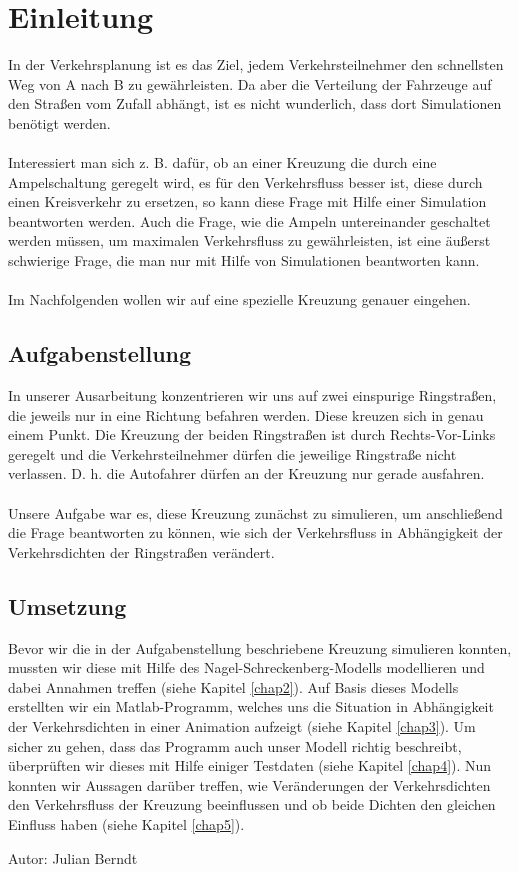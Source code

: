 \chapter{Einleitung}

In der Verkehrsplanung ist es das Ziel, jedem Verkehrsteilnehmer den schnellsten Weg von A nach B zu gewährleisten. Da aber die Verteilung der Fahrzeuge auf den Straßen vom Zufall abhängt, ist es nicht wunderlich, dass dort Simulationen benötigt werden. \\ \\
Interessiert man sich z. B. dafür, ob an einer Kreuzung die durch eine Ampelschaltung geregelt wird, es für den Verkehrsfluss besser ist, diese durch einen Kreisverkehr zu ersetzen, so kann diese Frage mit Hilfe einer Simulation beantworten werden. Auch die Frage, wie die Ampeln untereinander geschaltet werden müssen, um maximalen Verkehrsfluss zu gewährleisten, ist eine äußerst schwierige Frage, die man nur mit Hilfe von Simulationen beantworten kann. \\ \\
Im Nachfolgenden wollen wir auf eine spezielle Kreuzung genauer eingehen.

\section{Aufgabenstellung}\label{sec:aufgabenstellung}
In unserer Ausarbeitung konzentrieren wir uns auf zwei einspurige Ringstraßen, die jeweils nur in eine Richtung befahren werden. Diese kreuzen sich in genau einem Punkt. Die Kreuzung der beiden Ringstraßen ist durch Rechts-Vor-Links geregelt und die Verkehrsteilnehmer dürfen die jeweilige Ringstraße nicht verlassen. D. h. die Autofahrer dürfen an der Kreuzung nur gerade ausfahren. 
\\ \\
Unsere Aufgabe war es, diese Kreuzung zunächst zu simulieren, um anschließend die Frage beantworten zu können, wie sich der Verkehrsfluss in Abhängigkeit der Verkehrsdichten %
der Ringstraßen verändert.
\section{Umsetzung}
Bevor wir die in der Aufgabenstellung beschriebene Kreuzung simulieren konnten, mussten wir diese mit Hilfe des Nagel-Schreckenberg-Modells modellieren und dabei Annahmen treffen (siehe Kapitel \ref{chap2}). Auf Basis dieses Modells erstellten wir ein Matlab-Programm, welches uns die Situation in Abhängigkeit der Verkehrsdichten in einer Animation aufzeigt (siehe Kapitel \ref{chap3}). Um sicher zu gehen, dass das Programm auch unser Modell richtig beschreibt,
überprüften wir dieses mit Hilfe einiger Testdaten (siehe Kapitel \ref{chap4}). Nun konnten wir Aussagen darüber treffen, wie Veränderungen der Verkehrsdichten den Verkehrsfluss der Kreuzung beeinflussen und ob beide Dichten den gleichen Einfluss haben (siehe Kapitel \ref{chap5}).

\begin{flushright}
Autor: Julian Berndt
\end{flushright}